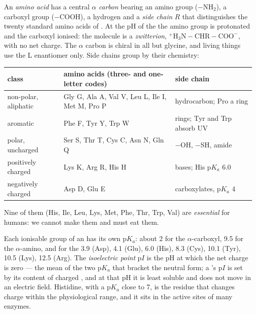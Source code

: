 \begin{definition}\label{def:b1:proteins:aminoacid}
An \emph{amino acid} has a central \emph{$\alpha$
carbon} bearing an amino group ($-\mathrm{NH_2}$), a carboxyl group
($-\mathrm{COOH}$), a hydrogen and a \emph{side chain}
$R$ that distinguishes the twenty standard amino acids of . At
the pH of the  the amino group is protonated and the carboxyl
ionised: the molecule is a \emph{zwitterion},
$\mathrm{^+H_3N{-}CHR{-}COO^-}$, with no net charge. The $\alpha$ carbon
is chiral in all but glycine, and living things use the L enantiomer
only. Side chains group by their chemistry:
\begin{center}
\footnotesize
\begin{tabular}{lll}
\hline
class & amino acids (three- and one-letter codes) & side chain \\
\hline
non-polar, aliphatic & Gly G, Ala A, Val V, Leu L, Ile I, Met M, Pro P & hydrocarbon; Pro a ring \\
aromatic & Phe F, Tyr Y, Trp W & rings; Tyr and Trp absorb UV \\
polar, uncharged & Ser S, Thr T, Cys C, Asn N, Gln Q & $-$OH, $-$SH, amide \\
positively charged & Lys K, Arg R, His H & bases; His p$K_a$ 6.0 \\
negatively charged & Asp D, Glu E & carboxylates, p$K_a$ 4 \\
\hline
\end{tabular}
\end{center}
Nine of them (His, Ile, Leu, Lys, Met, Phe, Thr, Trp, Val) are
\emph{essential} for humans: we cannot make them and must eat them.
\end{definition}

\begin{proposition}[Ionisation]\label{prop:b1:proteins:ionisation}
Each ionisable group of an  has its own p$K_a$: about 2 for
the $\alpha$-carboxyl, 9.5 for the $\alpha$-amino, and for the  3.9 (Asp), 4.1 (Glu), 6.0 (His), 8.3 (Cys), 10.1 (Tyr), 10.5
(Lys), 12.5 (Arg). The \emph{isoelectric point} p$I$ is the pH at which the net charge is zero --- the mean of
the two p$K_a$ that bracket the neutral form; a 's p$I$ is set
by its content of charged , and at that pH it is least
soluble and does not move in an electric field. Histidine, with a p$K_a$
close to 7, is the residue that changes charge within the physiological
range, and it sits in the active sites of many enzymes.
\end{proposition}

